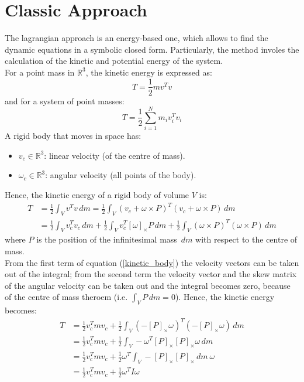 \documentclass[a4paper,12pt,oneside]{report}
\begin{document}
\section{Classic Approach}
The lagrangian approach is an energy-based one, which allows to find the dynamic equations in a symbolic closed form. Particularly, the method involes the calculation of the kinetic and potential energy of the system.\\
For a point mass in $\mathbb{R} ^3$, the kinetic energy is expressed as:
\begin{equation}
  T=\frac{1}{2}mv^Tv
\end{equation}
and for a system of point masses:
\begin{equation}
  T=\frac{1}{2}\sum_{i=1}^N m_iv_i^Tv_i
\end{equation}
A rigid body that moves in space has:
\begin{itemize}
  \item $v_c \in \mathbb{R} ^3$: linear velocity (of the centre of mass).
  \item $\omega_c \in \mathbb{R} ^3$: angular velocity (all points of the body).
\end{itemize}
Hence, the kinetic energy of a rigid body of volume $V$ is:
\begin{equation}
  \begin{split}
  T&=\frac{1}{2}\int_{V}v^Tv\,dm=\frac{1}{2}\int_{V}(v_c+\omega\times P)^T(v_c+\omega \times P)\,dm\\
  & =\frac{1}{2}\int_{V}v_c^Tv_c\,dm+\frac{1}{2}\int_{V}v_c^T[\omega]_{\times}P\,dm+\frac{1}{2}\int_{V}(\omega \times P)^T(\omega \times P)\,dm
\end{split}
\label{kinetic_body}
\end{equation}
where $P$ is the position of the infinitesimal mass $\,dm$ with respect to the centre of mass.\\
From the first term of equation (\ref{kinetic_body}) the velocity vectors can be taken out of the integral; from the second term the velocity vector and the skew matrix of the angular velocity can be taken out and the integral becomes zero, because of the centre of mass theroem (i.e. $\int_{V}P\,dm=0$). Hence, the kinetic energy becomes:
\begin{equation}
  \begin{split}
    T&=\frac{1}{2}v_c^Tmv_c+\frac{1}{2}\int_{V}(-[P]_{\times}\omega)^T(-[P]_{\times}\omega)\,dm\\
    &=\frac{1}{2}v_c^Tmv_c+\frac{1}{2}\int_{V}-\omega^T[P]_{\times}[P]_{\times}\omega\,dm\\
    &=\frac{1}{2}v_c^Tmv_c+\frac{1}{2}\omega^T\int_{V}-[P]_{\times}[P]_{\times}\,dm \ \omega\\
    &=\frac{1}{2}v_c^Tmv_c+\frac{1}{2}\omega^T I \omega
  \end{split}
  \label{final_kinetic_body}
\end{equation}
\end{document}

